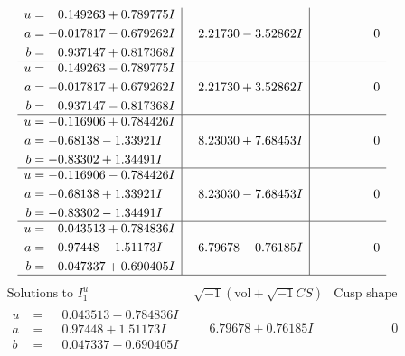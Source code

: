 \documentclass[1p]{elsarticle_modified}
\theoremstyle{definition}
\newcommand{\I}{\sqrt{-1}}
\begin{document}
$$\begin{array}{c|c|c}
\begin{aligned}
u &= \phantom{-}0.149263 + 0.789775 I \\
a &= -0.017817 - 0.679262 I \\
b &= \phantom{-}0.937147 + 0.817368 I\end{aligned}
 & \phantom{-}2.21730 - 3.52862 I & \phantom{-0.000000 } 0 \\ \hline\begin{aligned}
u &= \phantom{-}0.149263 - 0.789775 I \\
a &= -0.017817 + 0.679262 I \\
b &= \phantom{-}0.937147 - 0.817368 I\end{aligned}
 & \phantom{-}2.21730 + 3.52862 I & \phantom{-0.000000 } 0 \\ \hline\begin{aligned}
u &= -0.116906 + 0.784426 I \\
a &= -0.68138 - 1.33921 I \\
b &= -0.83302 + 1.34491 I\end{aligned}
 & \phantom{-}8.23030 + 7.68453 I & \phantom{-0.000000 } 0 \\ \hline\begin{aligned}
u &= -0.116906 - 0.784426 I \\
a &= -0.68138 + 1.33921 I \\
b &= -0.83302 - 1.34491 I\end{aligned}
 & \phantom{-}8.23030 - 7.68453 I & \phantom{-0.000000 } 0 \\ \hline\begin{aligned}
u &= \phantom{-}0.043513 + 0.784836 I \\
a &= \phantom{-}0.97448 - 1.51173 I \\
b &= \phantom{-}0.047337 + 0.690405 I\end{aligned}
 & \phantom{-}6.79678 - 0.76185 I & \phantom{-0.000000 } 0\\
 \hline 
 \end{array}$$\newpage$$\begin{array}{c|c|c}  
\text{Solutions to }I^u_{1}& \I (\text{vol} + \sqrt{-1}CS) & \text{Cusp shape}\\
 \hline 
\begin{aligned}
u &= \phantom{-}0.043513 - 0.784836 I \\
a &= \phantom{-}0.97448 + 1.51173 I \\
b &= \phantom{-}0.047337 - 0.690405 I\end{aligned}
 & \phantom{-}6.79678 + 0.76185 I & \phantom{-0.000000 } 0 \\ \hline\begin{aligned}

\end{aligned}
\end{array}$$
\end{document}
